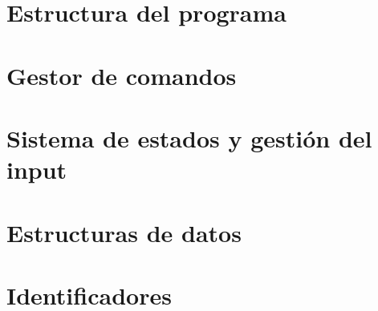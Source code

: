 \section{Estructura del programa}

\section{Gestor de comandos}

\section{Sistema de estados y gestión del input}

\section{Estructuras de datos}

\section{Identificadores}